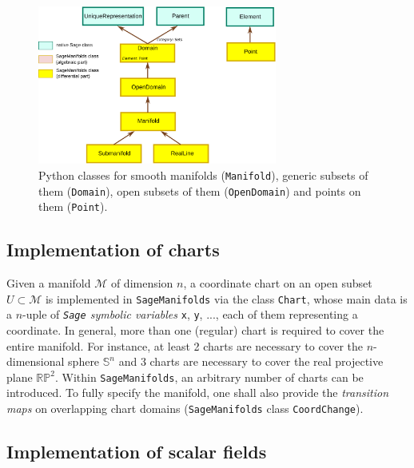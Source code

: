 \documentclass[a4paper]{jpconf}
\newcommand{\soft}[1]{\texttt{#1}}
\newcommand{\code}[1]{\texttt{#1}}
\newcommand{\Sage}{\soft{Sage}}
\newcommand{\SM}{\soft{SageManifolds}}
\begin{document}
\begin{figure}
\begin{center}
\includegraphics[width=0.7\textwidth]{domain_classes.pdf}
\end{center}
\caption{\label{f:domain_classes} Python classes for 
smooth manifolds (\code{Manifold}), generic subsets of them 
(\code{Domain}), open subsets of them (\code{OpenDomain})
and points on them (\code{Point}).}
\end{figure}

\subsection{Implementation of charts}

Given a manifold $\mathcal{M}$ of dimension $n$, a coordinate chart 
on an open subset $U\subset\mathcal{M}$ is implemented in \SM{} 
via the class \code{Chart}, whose main data is 
a $n$-uple of \emph{\Sage{} symbolic variables} \code{x}, \code{y}, ..., each of 
them representing a coordinate.
In general, more than one (regular) chart is required to cover the entire manifold.
For instance, at least 2 charts are necessary to cover the $n$-dimensional sphere 
$\mathbb{S}^n$ and 3 charts are necessary to cover the real projective plane
$\mathbb{RP}^2$. 
Within \SM{}, an arbitrary number of charts can be introduced.
To fully specify the manifold, one shall also provide the \emph{transition maps} on
overlapping chart domains (\SM{} class \code{CoordChange}).

\subsection{Implementation of scalar fields}
\end{document}
